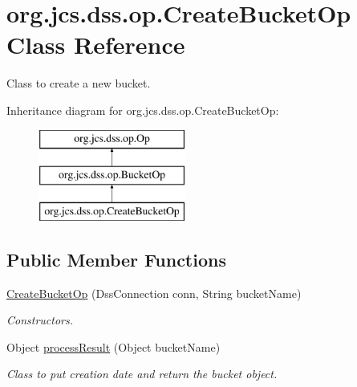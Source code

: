 \hypertarget{classorg_1_1jcs_1_1dss_1_1op_1_1CreateBucketOp}{}\section{org.\+jcs.\+dss.\+op.\+Create\+Bucket\+Op Class Reference}
\label{classorg_1_1jcs_1_1dss_1_1op_1_1CreateBucketOp}


Class to create a new bucket.  


Inheritance diagram for org.\+jcs.\+dss.\+op.\+Create\+Bucket\+Op\+:\begin{figure}[H]
\begin{center}
\leavevmode
\includegraphics[height=3.000000cm]{classorg_1_1jcs_1_1dss_1_1op_1_1CreateBucketOp}
\end{center}
\end{figure}
\subsection*{Public Member Functions}
\begin{DoxyCompactItemize}
\item 
\hyperlink{classorg_1_1jcs_1_1dss_1_1op_1_1CreateBucketOp_a723a84d7217ac9cb9df50fff6a84c371}{Create\+Bucket\+Op} (Dss\+Connection conn, String bucket\+Name)\hypertarget{classorg_1_1jcs_1_1dss_1_1op_1_1CreateBucketOp_a723a84d7217ac9cb9df50fff6a84c371}{}\label{classorg_1_1jcs_1_1dss_1_1op_1_1CreateBucketOp_a723a84d7217ac9cb9df50fff6a84c371}

\begin{DoxyCompactList}\small\item\em Constructors. \end{DoxyCompactList}\item 
Object \hyperlink{classorg_1_1jcs_1_1dss_1_1op_1_1CreateBucketOp_ad9317afb5adad4749a2e2060c768ddb3}{process\+Result} (Object bucket\+Name)
\begin{DoxyCompactList}\small\item\em Class to put creation date and return the bucket object. \end{DoxyCompactList}\end{DoxyCompactItemize}
